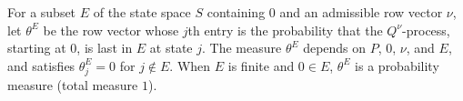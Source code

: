 For a subset $E$ of the state space $S$ containing $0$ and an admissible row vector $\nu$, let $\theta^E$ be the row vector whose $j$th entry is the probability that the $Q^\nu$-process, starting at $0$, is last in $E$ at state $j$. The measure $\theta^E$ depends on $P$, $0$, $\nu$, and $E$, and satisfies $\theta^E_j = 0$ for $j \notin E$. When $E$ is finite and $0 \in E$, $\theta^E$ is a probability measure (total measure $1$).
